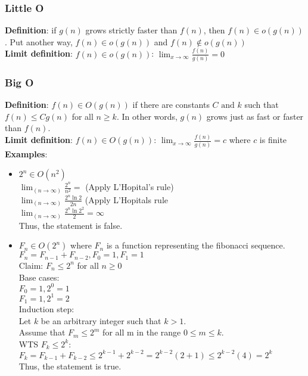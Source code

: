 \documentclass{article}
\begin{document}
\begin{spacing}{1.5}
\subsubsection{Little O}
\label{sec:littleo}
\textbf{Definition}: if $g(n)$ grows strictly faster than $f(n)$, then $f(n) \in o(g(n))$. Put another way, $f(n) \in o(g(n))$ and $f(n) \notin o(g(n)) $\\
\textbf{Limit definition}: $f(n) \in o(g(n))$: $\lim_{x\to\infty} \frac{f(n)}{g(n)} = 0$
\subsubsection{Big O}
\label{sec:bigo}
\textbf{Definition}: $f(n) \in O(g(n))$ if there are constants $C \text{ and }k$ such that $f(n) \leq Cg(n)$ for all $n \geq k$. In other words, $g(n)$ grows just as fast or faster than $f(n)$.\\
\textbf{Limit definition}: $f(n) \in O(g(n))$: $\lim_{x\to\infty} \frac{f(n)}{g(n)} = c$ where $c$ is finite\\
\textbf{Examples}:\\
\begin{itemize}
    \item $2^n \in O(n^2)$\\
    $\lim_(n \rightarrow \infty)\frac{2^n}{n^2} =$ (Apply L'Hopital's rule) \\
    $\lim_(n \rightarrow \infty)\frac{2^n\ln{2}}{2n}$ (Apply L'Hopitals rule\\
    $\lim_(n \rightarrow \infty)\frac{2^n\ln{2}^2}{2} = \infty$ \\
    Thus, the statement is false.
    \item $F_n \in O(2^n)$ where $F_n$ is a function representing the fibonacci sequence.\\
    $F_n = F_{n-1} + F_{n-2}, F_0=1, F_1=1$\\
    Claim: $F_n \leq 2^n$ for all $n \geq 0$\\
    Base cases:\\
    $F_0=1,2^0=1$\\
    $F_1=1, 2^1=2$\\
    Induction step:\\
    Let $k$ be an arbitrary integer such that $k > 1$. \\
    Assume that $F_m \leq 2^m$ for all m in the range $0 \leq m \leq k$.\\
    WTS $F_k \leq 2^k$:\\
    $F_k=F_{k-1}+F_{k-2} \leq 2^{k-1}+2^{k-2} = 2^{k-2}(2+1) \leq 2^{k-2}(4) = 2^k$\\
    Thus, the statement is true.
    

\end{itemize}
\end{spacing}
\end{document}
